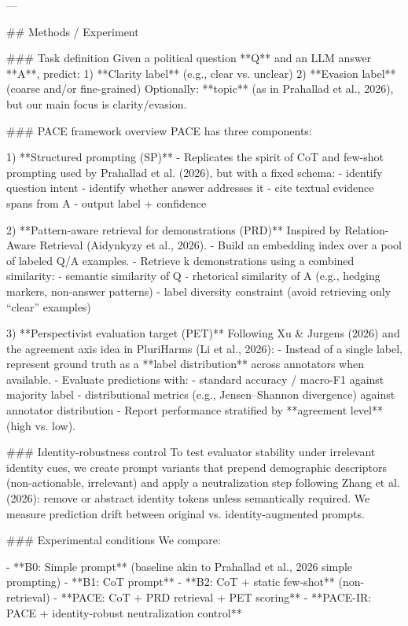 ---

## Methods / Experiment  

### Task definition  
Given a political question **Q** and an LLM answer **A**, predict:  
1) **Clarity label** (e.g., clear vs. unclear)  
2) **Evasion label** (coarse and/or fine-grained)  
Optionally: **topic** (as in Prahallad et al., 2026), but our main focus is clarity/evasion.

### PACE framework overview  
PACE has three components:

1) **Structured prompting (SP)**  
   - Replicates the spirit of CoT and few-shot prompting used by Prahallad et al. (2026), but with a fixed schema:
     - identify question intent  
     - identify whether answer addresses it  
     - cite textual evidence spans from A  
     - output label + confidence

2) **Pattern-aware retrieval for demonstrations (PRD)**  
   Inspired by Relation-Aware Retrieval (Aidynkyzy et al., 2026).  
   - Build an embedding index over a pool of labeled Q/A examples.  
   - Retrieve k demonstrations using a combined similarity:
     - semantic similarity of Q  
     - rhetorical similarity of A (e.g., hedging markers, non-answer patterns)  
     - label diversity constraint (avoid retrieving only “clear” examples)

3) **Perspectivist evaluation target (PET)**  
   Following Xu & Jurgens (2026) and the agreement axis idea in PluriHarms (Li et al., 2026):  
   - Instead of a single label, represent ground truth as a **label distribution** across annotators when available.  
   - Evaluate predictions with:
     - standard accuracy / macro-F1 against majority label  
     - distributional metrics (e.g., Jensen–Shannon divergence) against annotator distribution  
   - Report performance stratified by **agreement level** (high vs. low).

### Identity-robustness control  
To test evaluator stability under irrelevant identity cues, we create prompt variants that prepend demographic descriptors (non-actionable, irrelevant) and apply a neutralization step following Zhang et al. (2026): remove or abstract identity tokens unless semantically required. We measure prediction drift between original vs. identity-augmented prompts.

### Experimental conditions  
We compare:

- **B0: Simple prompt** (baseline akin to Prahallad et al., 2026 simple prompting)  
- **B1: CoT prompt**  
- **B2: CoT + static few-shot** (non-retrieval)  
- **PACE: CoT + PRD retrieval + PET scoring**  
- **PACE-IR: PACE + identity-robust neutralization control**

